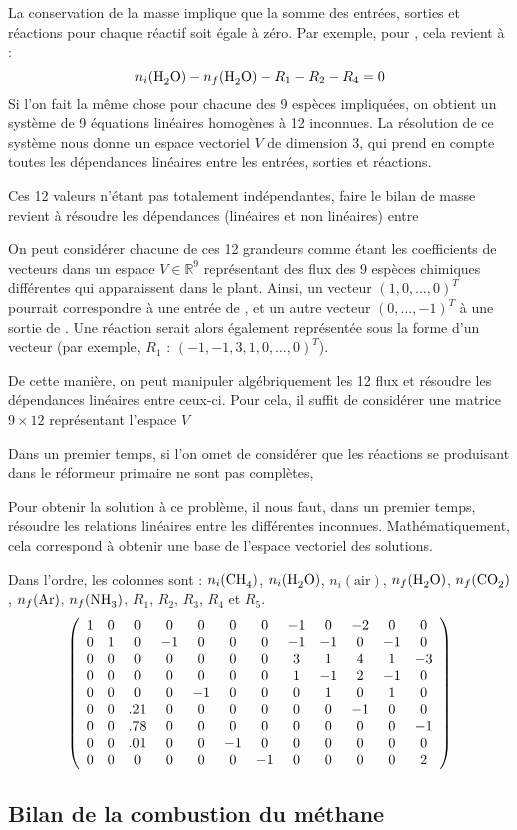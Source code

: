 La conservation de la masse implique que la somme des entrées, sorties et réactions pour chaque réactif soit égale à zéro. Par exemple, pour , cela revient à :
\[
  n_i(\ce{H2O}) - n_f(\ce{H2O}) - R_1 - R_2 - R_4 = 0
\]
Si l'on fait la même chose pour chacune des 9 espèces impliquées, on obtient un système de 9 équations linéaires homogènes à 12 inconnues. La résolution de ce système nous donne un espace vectoriel $V$ de dimension 3, qui prend en compte toutes les dépendances linéaires entre les entrées, sorties et réactions.

Ces 12 valeurs n'étant pas totalement indépendantes, faire le bilan de masse revient à résoudre les dépendances (linéaires et non linéaires) entre 

On peut considérer chacune de ces 12 grandeurs comme étant les coefficients de vecteurs dans un espace $V \in \mathbb{R}^9$ représentant des flux des 9 espèces chimiques différentes qui apparaissent dans le plant. Ainsi, un vecteur $(1, 0, \dots, 0)^T$ pourrait correspondre à une entrée de , et un autre vecteur $(0, \dots, -1)^T$ à une sortie de . Une réaction serait alors également représentée sous la forme d'un vecteur (par exemple, $R_1$ : $(-1, -1, 3, 1, 0, \dots, 0)^T$).

De cette manière, on peut manipuler algébriquement les 12 \og{}flux\fg{} et résoudre les dépendances linéaires entre ceux-ci. Pour cela, il suffit de considérer une matrice $9\times12$ représentant l'espace $V$

Dans un premier temps, si l'on omet de considérer que les réactions se produisant dans le réformeur primaire ne sont pas complètes, 

Pour obtenir la solution à ce problème, il nous faut, dans un premier temps, résoudre les relations linéaires entre les différentes inconnues. Mathématiquement, cela correspond à obtenir une base de l'espace vectoriel des solutions.

Dans l'ordre, les colonnes sont : $n_i(\ce{CH4})$, $n_i(\ce{H2O})$, $n_i(\text{air})$, $n_f(\ce{H2O})$, $n_f(\ce{CO2})$, $n_f(\ce{Ar})$, $n_f(\ce{NH3})$, $R_1$, $R_2$, $R_3$, $R_4$ et $R_5$.
\[
\left(
\begin{array}{*{12}c}
  1 & 0 & 0 & 0 & 0 & 0 & 0 & -1 & 0 & -2 & 0 & 0 \\
  0 & 1 & 0 & -1 & 0 & 0 & 0 & -1 & -1 & 0 & -1 & 0 \\
  0 & 0 & 0 & 0 & 0 & 0 & 0 & 3 & 1 & 4 & 1 & -3 \\
  0 & 0 & 0 & 0 & 0 & 0 & 0 & 1 & -1 & 2 & -1 & 0 \\
  0 & 0 & 0 & 0 & -1 & 0 & 0 & 0 & 1 & 0 & 1 & 0 \\
  0 & 0 & .21 & 0 & 0 & 0 & 0 & 0 & 0 & -1 & 0 & 0 \\
  0 & 0 & .78 & 0 & 0 & 0 & 0 & 0 & 0 & 0 & 0 & -1 \\
  0 & 0 & .01 & 0 & 0 & -1 & 0 & 0 & 0 & 0 & 0 & 0 \\
  0 & 0 & 0 & 0 & 0 & 0 & -1 & 0 & 0 & 0 & 0 & 2
\end{array}
\right)
\]


\subsection{Bilan de la combustion du méthane}

